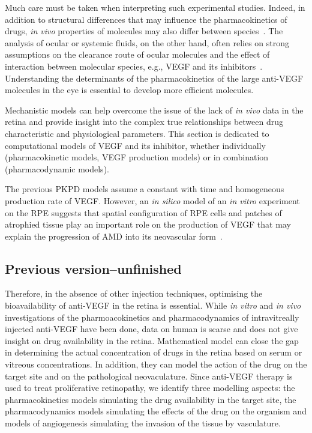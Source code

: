 \documentclass[11pt,a4paper]{article}
\begin{document}
Much care must be taken when interpreting such experimental studies.
Indeed, in addition to structural differences that may influence the pharmacokinetics of drugs, \textit{in vivo} properties of molecules may also differ between species~\cite{garcia-quintanilla_pharmacokinetics_2019}.
The analysis of ocular or systemic fluids, on the other hand, often relies on strong assumptions on the clearance route of ocular molecules and the effect of interaction between molecular species, e.g., VEGF and its inhibitors~\cite{Missel_2012}.
Understanding the determinants of the pharmacokinetics of the large anti-VEGF molecules in the eye is essential to develop more efficient molecules.

Mechanistic models can help overcome the issue of the lack of \textit{in vivo} data in the retina and provide insight into the complex true relationships between drug characteristic and physiological parameters.
This section is dedicated to computational models of VEGF and its inhibitor, whether individually (pharmacokinetic models, VEGF production models) or in combination (pharmacodynamic models).




The previous PKPD models assume a constant with time and homogeneous production rate of VEGF.
However, an \textit{in silico} model of an \textit{in vitro} experiment on the RPE suggests that spatial configuration of RPE cells and patches of atrophied tissue play an important role on the production of VEGF that may explain the progression of AMD into its neovascular form~\cite{Baker_2017}.  






\subsection{Previous version--unfinished}

Therefore, in the absence of other injection techniques, optimising the bioavailability of anti-VEGF in the retina is essential.
While \textit{in vitro} and \textit{in vivo} investigations of the pharmoacokinetics and pharmacodynamics of intravitreally injected anti-VEGF have been done, data on human is scarse and does not give insight on drug availability in the retina.
Mathematical model can close the gap in determining the actual concentration of drugs in the retina based on serum or vitreous concentrations.
In addition, they can model the action of the drug on the target site and on the pathological neovaculature.
Since anti-VEGF therapy is used to treat proliferative retinopathy, we identify three modelling aspects: the pharmacokinetics models simulating the drug availability in the target site, the pharmacodynamics models simulating the effects of the drug on the organism and models of angiogenesis simulating the invasion of the tissue by vasculature.
\end{document}
